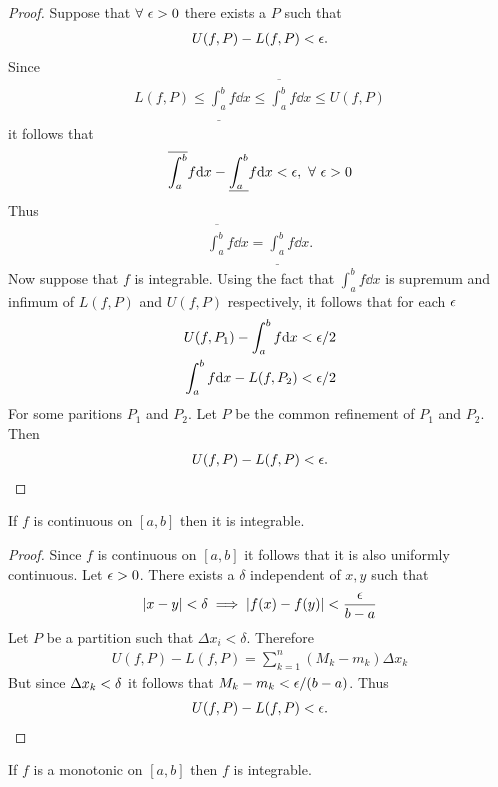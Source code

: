 \begin{proof}
  Suppose that $\forall\ \e>0$ there exists a $P$ such that
  \begin{align*}
    U(f,P) - L(f,P) < \epsilon.
  \end{align*}
  Since
  \begin{align*}
    L(f,P) \leq \underline{\int^b_a} f \dd x \leq \overline{\int^b_a} f \dd x \leq U(f,P)
  \end{align*}
  it follows that
  \begin{align*}
    \overline{\int^b_a} f \dd x - \underline{\int^b_a} f \dd x < \e,\ \forall\ \e>0
  \end{align*}
  Thus
  \begin{align*}
    \overline{\int^b_a} f\dd x = \underline{\int^b_a} f \dd x.
  \end{align*}
  Now suppose that $f$ is integrable. Using the fact that $\int^b_a f \dd x$ is supremum and infimum of $L(f,P)$ and $U(f,P)$ respectively, it follows that for each $\epsilon$
  \begin{align*}
    U(f,P_1) -\int^b_a f \dd x < \epsilon/2\\
    \int^b_a f \dd x  - L(f,P_2)< \epsilon/2
  \end{align*}
  For some paritions $P_1$ and $P_2$. Let $P$ be the common refinement of $P_1$ and $P_2$. Then
  \begin{align*}
    U(f,P) - L(f,P) < \epsilon.
  \end{align*}
\end{proof}
\begin{proposition}
  If $f$ is continuous on $[a,b]$ then it is integrable.
\end{proposition}
\begin{proof}
  Since $f$ is continuous on $[a,b]$ it follows that it is also uniformly continuous. Let $\epsilon>0$. There exists a $\delta$ independent of $x,y$ such that
  \begin{align*}
    |x-y| < \delta \implies |f(x) - f(y)| < \frac{\epsilon}{b-a}
  \end{align*}
  Let $P$ be a partition such that $\Delta x_i < \delta$. Therefore
  \begin{align*}
    U(f,P) - L(f,P) = \sum_{k=1}^n (M_k - m_k) \Delta x_k
  \end{align*}
  But since $\Delta x_k < \delta$ it follows that $M_k - m_k < \epsilon/(b-a)$. Thus
  \begin{align*}
    U(f,P) -L(f,P) < \epsilon.
  \end{align*}
\end{proof}
\begin{proposition}
  If $f$ is a monotonic on $[a,b]$ then $f$ is integrable.
\end{proposition}
